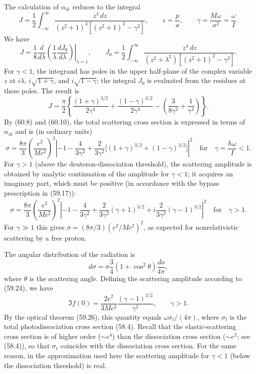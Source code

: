 The calculation of $\alpha_{ik}$ reduces to the integral
\[
J=\frac12\int_{-\infty}^{\infty}
\frac{z^4\,dz}{(z^2+1)^3[(z^2+1)^2-\gamma^2]},
\qquad z=\frac p\varkappa,
\qquad \gamma=\frac{M\omega}{\varkappa^2}=\frac\omega I.
\]
We have
\[
J=\left.\frac18\frac d{d\lambda}
\left(\frac1\lambda\frac{dJ_0}{d\lambda}\right)\right|_{\lambda=1},
\qquad
J_0=\frac12\int_{-\infty}^{\infty}
\frac{z^4\,dz}{(z^2+\lambda^2)[(z^2+1)^2-\gamma^2]}.
\]
For $\gamma<1$, the integrand has poles in the upper half-plane of the complex variable $z$ at $i\lambda$, $i\sqrt{1+\gamma}$, and $i\sqrt{1-\gamma}$; the integral $J_0$ is evaluated from the residues at these poles. The result is
\[
J=\frac\pi2\left\{\frac{(1+\gamma)^{3/2}}{2\gamma^4}
+\frac{(1-\gamma)^{3/2}}{2\gamma^4}
-\left(\frac3{8\gamma^2}+\frac1{\gamma^4}\right)\right\}.
\]
By (60.8) and (60.10), the total scattering cross section is expressed in terms of $\alpha_{ik}$ and is (in ordinary units)
\[
\sigma=\frac{8\pi}{3}\left(\frac{e^2}{Mc^2}\right)^{\!2}
\left|-1-\frac4{3\gamma^2}+\frac2{3\gamma^2}
\big[(1+\gamma)^{3/2}+(1-\gamma)^{3/2}\big]\right|^2
\quad\text{for}\quad \gamma=\frac{\hbar\omega}{I}<1.
\]
For $\gamma>1$ (above the deuteron-dissociation threshold), the scattering amplitude is obtained by analytic continuation of the amplitude for $\gamma<1$; it acquires an imaginary part, which must be positive (in accordance with the bypass prescription in (59.17)):
\[
\sigma=\frac{8\pi}{3}\left(\frac{e^2}{Mc^2}\right)^{\!2}
\left|-1-\frac4{3\gamma^2}+\frac2{3\gamma^2}(\gamma+1)^{3/2}
+i\frac2{3\gamma^2}(\gamma-1)^{3/2}\right|^2
\quad\text{for}\quad \gamma>1.
\]
For $\gamma\gg1$ this gives $\sigma=(8\pi/3)(e^2/Mc^2)^2$, as expected for nonrelativistic scattering by a free proton.

The angular distribution of the radiation is
\[
d\sigma=\sigma\frac34(1+\cos^2\theta)\frac{do}{4\pi},
\]
where $\theta$ is the scattering angle. Defining the scattering amplitude according to (59.24), we have
\[
\Im f(0)=\frac{2e^2}{3Mc^2}\frac{(\gamma-1)^{3/2}}{\gamma^2},
\qquad \gamma>1.
\]
By the optical theorem (59.26), this quantity equals $\omega\sigma_t/(4\pi)$, where $\sigma_t$ is the total photodissociation cross section (58.4). Recall that the elastic-scattering cross section is of higher order ($\sim e^4$) than the dissociation cross section ($\sim e^2$; see (58.4)), so that $\sigma_t$ coincides with the dissociation cross section. For the same reason, in the approximation used here the scattering amplitude for $\gamma<1$ (below the dissociation threshold) is real.
